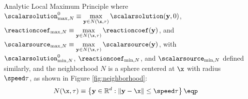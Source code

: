 \begin{theorem}{Analytic Local Maximum Principle}
   where $\scalarsolution_{\max,N}^0\equiv\max\limits_{\mathbf{y}\in N(\x,\tau)}
   \scalarsolution(\mathbf{y},0)$,
   $\reactioncoef_{\max,N}\equiv\max\limits_{\mathbf{y}\in N(\x,\tau)}
   \reactioncoef(\mathbf{y})$, and
   $\scalarsource_{\max,N}\equiv\max\limits_{\mathbf{y}\in N(\x,\tau)}
   \scalarsource(\mathbf{y})$, 
   with $\scalarsolution_{\min,N}^0$, $\reactioncoef_{\min,N}$, and
   $\scalarsource_{\min,N}$ defined similarly, and the neighborhood $N$ is a
   sphere centered at $\x$ with radius $\speed\tau$, as shown in
   Figure \ref{fig:neighborhood}:
   \begin{equation}\label{eq:neighborhood}
      N(\x,\tau)\equiv\left\{\mathbf{y}\in\mathbb{R}^d : 
         \|\mathbf{y} - \x\| \le \speed\tau\right\} \eqp
   \end{equation}
\end{theorem}

